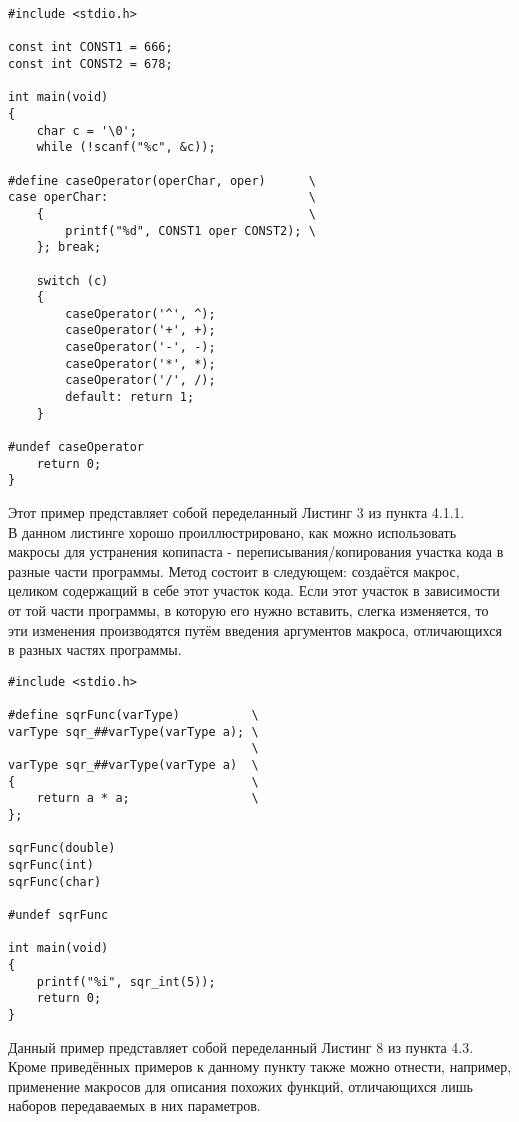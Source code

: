 \documentclass[a4paper]{article}
\begin{document}
	\begin{lstlisting}[caption={Switch and macros}]
#include <stdio.h>

const int CONST1 = 666;
const int CONST2 = 678;

int main(void)
{
    char c = '\0';
    while (!scanf("%c", &c));
    
#define caseOperator(operChar, oper)      \
case operChar:                            \
    {                                     \
        printf("%d", CONST1 oper CONST2); \
    }; break;

    switch (c)
    {
  	    caseOperator('^', ^);
  	    caseOperator('+', +);
  	    caseOperator('-', -);
  	    caseOperator('*', *);
        caseOperator('/', /);
        default: return 1;
    }
    
#undef caseOperator
    return 0;
}
	\end{lstlisting}
Этот пример представляет собой переделанный Листинг 3 из пункта 4.1.1. \\ 

В данном листинге хорошо проиллюстрировано, как можно использовать макросы для устранения копипаста - переписывания/копирования участка кода в разные части программы. Метод состоит в следующем: создаётся макрос, целиком содержащий в себе этот участок кода. Если этот участок в зависимости от той части программы, в которую его нужно вставить, слегка изменяется, то эти изменения производятся путём введения аргументов макроса, отличающихся в разных частях программы.

\newpage

	\begin{lstlisting}[caption={Functions and macros}]
#include <stdio.h>

#define sqrFunc(varType)          \
varType sqr_##varType(varType a); \
                                  \
varType sqr_##varType(varType a)  \
{                                 \
    return a * a;                 \
};                                

sqrFunc(double)
sqrFunc(int)
sqrFunc(char)

#undef sqrFunc

int main(void)
{
    printf("%i", sqr_int(5));
    return 0;
}
	\end{lstlisting} 
Данный пример представляет собой переделанный Листинг 8 из пункта 4.3. \\

Кроме приведённых примеров к данному пункту также можно отнести, например, применение макросов для описания похожих функций, отличающихся лишь наборов передаваемых в них параметров. \\
\end{document}

